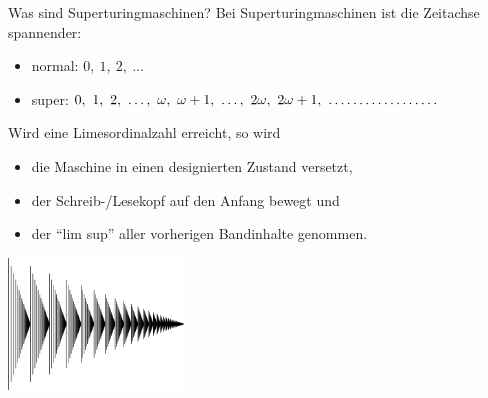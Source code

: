 \documentclass[12pt,compress,ngerman,utf8,t]{beamer}
\begin{document}
\begin{frame}{Was sind Superturingmaschinen?}
  Bei Superturingmaschinen ist die Zeitachse spannender:
  \begin{itemize}
    \item normal: $0,\ 1,\ 2,\ \ldots$
    \item super:\phantom{rl} $0,\ 1,\ 2,\ \ldots,\ \omega,\ \omega + 1,\ \ldots,\ 2\omega,\ 2\omega
    + 1,\ \makebox[\widthof{R}][l]{$\ldots\ldots\ldots\ldots\ldots\ldots$}$
  \end{itemize}
  \bigskip

  Wird eine Limesordinalzahl erreicht, so wird
  \begin{itemize}
    \item die Maschine in einen designierten Zustand versetzt,
    \item der Schreib-/Lesekopf auf den Anfang bewegt und
    \item der "`lim sup"' aller vorherigen Bandinhalte genommen.
  \end{itemize}

  \begin{center}
    \includegraphics[width=0.35\textwidth]{images/ordinal-omega-squared}
  \end{center}
\end{frame}
\end{document}
